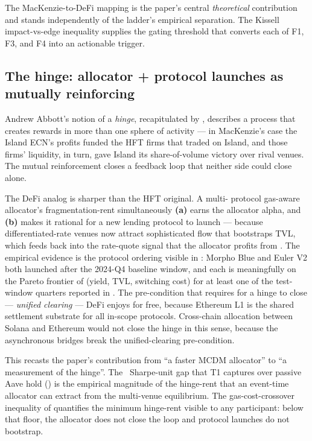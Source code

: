 The MacKenzie-to-DeFi mapping is the paper's central
\emph{theoretical} contribution and stands independently of the
ladder's empirical separation.  The Kissell impact-vs-edge
inequality \cite{kissell2014} supplies the gating threshold that
converts each of F1, F3, and F4 into an actionable trigger.

\subsection{The hinge: allocator + protocol launches as mutually reinforcing}
\label{sec:disc-hinge}

Andrew Abbott's notion of a \emph{hinge}, recapitulated by
\cite[pp.\,93--94]{mackenzie2021}, describes a process that
creates rewards in more than one sphere of activity --- in
MacKenzie's case the Island ECN's profits funded the HFT firms
that traded on Island, and those firms' liquidity, in turn, gave
Island its share-of-volume victory over rival venues.  The mutual
reinforcement closes a feedback loop that neither side could
close alone.

The DeFi analog is sharper than the HFT original.  A multi-
protocol gas-aware allocator's fragmentation-rent simultaneously
\textbf{(a)} earns the allocator alpha, and \textbf{(b)} makes
it rational for a new lending protocol to launch --- because
differentiated-rate venues now attract sophisticated flow that
bootstraps TVL, which feeds back into the rate-quote signal that
the allocator profits from \cite{gudgeon2020loanable}.  The
empirical evidence is the protocol ordering visible in
: Morpho Blue and Euler V2 both launched
after the 2024-Q4 baseline window, and each is meaningfully on
the Pareto frontier of (yield, TVL, switching cost) for at least
one of the test-window quarters reported in
.  The pre-condition that
\cite[p.\,95]{mackenzie2021} requires for a hinge to close ---
\emph{unified clearing} --- DeFi enjoys for free, because
Ethereum L1 is the shared settlement substrate for all in-scope
protocols.  Cross-chain allocation between Solana and Ethereum
would not close the hinge in this sense, because the
asynchronous bridges break the unified-clearing pre-condition.

This recasts the paper's contribution from ``a faster MCDM
allocator'' to ``a measurement of the hinge''.  The
\HOneAuxDelta\ Sharpe-unit gap that T1 captures over passive
Aave hold () is the empirical magnitude
of the hinge-rent that an event-time allocator can extract from
the multi-venue equilibrium.  The gas-cost-crossover inequality
of  quantifies the minimum hinge-rent
visible to any participant: below that floor, the allocator does
not close the loop and protocol launches do not bootstrap.

